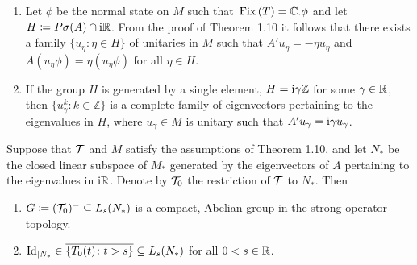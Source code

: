 \begin{remarks}\label{rem:d3-1.12}

\begin{enumerate}[\upshape (i), wide, labelindent=.5em]

\item 
Let $\phi$ be the normal state on $M$ such that $\mathop{}\mathrm{Fix}\left(T\right) = \mathbb{C} . \phi$ and let $H \coloneqq P\sigma(A) \cap \mathrm{i}\mathbb{R}$.
From the proof of Theorem 1.10 it follows that there exists a family $\{u_{\eta} \colon \eta \in H\}$ of unitaries in $M$ such that $A'u_{\eta} = -\eta u_{\eta}$ and $A(u_{\eta}\phi) = \eta(u_{\eta}\phi)$ for all $\eta \in H$.

\item 
If the group $H$ is generated by a single element, \ie $H = \mathrm{i}\gamma\mathbb{Z}$ for some $\gamma \in \mathbb{R}$, then 
$\{u_{\gamma}^{k} \colon k \in \mathbb{Z}\}$ 
is a complete family of eigenvectors pertaining to the eigenvalues in $H$, where $u_{\gamma} \in M$ is unitary such that $A'u_{\gamma} = \mathrm{i}\gamma u_{\gamma}$.

\end{enumerate}
\end{remarks}
\begin{proposition}\label{prop:d3-1.13}
Suppose that $\mathcal{T}$ and $M$ satisfy the assumptions of Theorem 1.10, and let $N_{*}$ be the closed linear subspace of $M_{*}$ generated by the eigenvectors of $A$ pertaining to the eigenvalues in $\mathrm{i}\mathbb{R}$.
Denote by $\mathcal{T}_{0}$ the restriction of $\mathcal{T}$ to $N_{*}$.
Then
\begin{enumerate}[\upshape (i)]

\item 
$G \coloneqq (\mathcal{T}_{0})^{-} \subseteq L_{s}(N_{*})$ is a compact, Abelian group in the strong operator topology.

\item 
$\operatorname{Id}_{| N_{{*}}} \in \overline{\{T_{0}(t) \colon t>s\}} \subseteq L_{s}(N_{*})$ for all $0<s \in \mathbb{R}$.
\end{enumerate}
\end{proposition}
